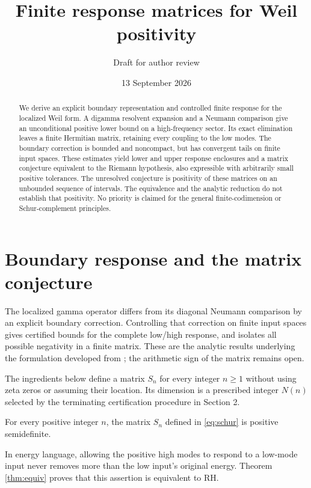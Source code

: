 
\newcommand{\MainManuscript}{1}
\title{Finite response matrices for Weil positivity}
\author{Draft for author review}
\date{13 September 2026}
\maketitle
\begin{abstract}
We derive an explicit boundary representation and controlled finite response
for the localized Weil form. A digamma resolvent expansion and a Neumann
comparison give an unconditional positive lower bound on a high-frequency
sector. Its exact elimination leaves a finite Hermitian matrix, retaining
every coupling to the low modes. The boundary correction is bounded and
noncompact, but has convergent tails on finite input spaces. These estimates
yield lower and upper response enclosures and a matrix conjecture equivalent
to the Riemann hypothesis, also expressible with arbitrarily small positive
tolerances. The unresolved conjecture is positivity of these
matrices on an unbounded sequence of intervals. The equivalence and the analytic
reduction do not establish that positivity. No priority is claimed for the
general finite-codimension or Schur-complement principles.
\end{abstract}

\section{Boundary response and the matrix conjecture}
The localized gamma operator differs from its diagonal Neumann comparison
by an explicit boundary correction. Controlling that correction on finite
input spaces gives certified bounds for the complete low/high response,
and isolates all possible negativity in a finite matrix.
These are the analytic results underlying the formulation developed from
\cite{Investigation}; the arithmetic sign of the matrix remains open.

The ingredients below define a matrix $S_n$ for every integer $n\ge1$ without
using zeta zeros or assuming their location. Its dimension is a prescribed
integer $N(n)$ selected by the terminating certification procedure in Section 2.
\begin{conjecture}\label{conj:main}
For every positive integer $n$, the matrix $S_n$ defined in
\eqref{eq:schur} is positive semidefinite.
\end{conjecture}
In energy language, allowing the positive high modes to respond to a low-mode
input never removes more than the low input's original energy. Theorem
\ref{thm:equiv} proves that this assertion is equivalent to RH.

